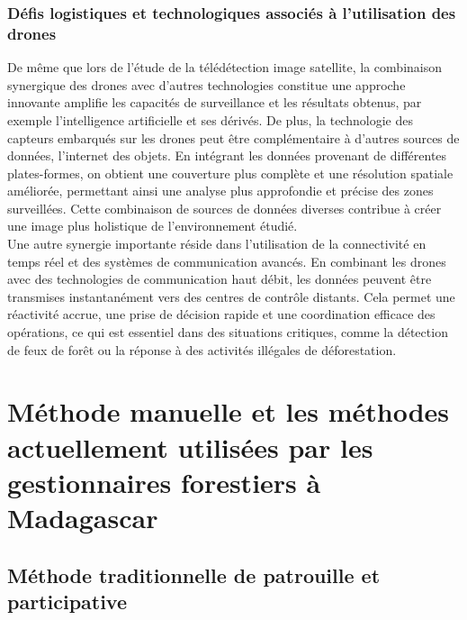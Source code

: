 \subsubsection{Défis logistiques et technologiques associés à l'utilisation des drones}
De même que lors de l’étude de la télédétection image satellite, la combinaison synergique des drones avec d'autres technologies constitue une approche innovante amplifie les capacités de surveillance et les résultats obtenus, par exemple l’intelligence artificielle et ses dérivés. De plus, la technologie des capteurs embarqués sur les drones peut être complémentaire à d'autres sources de données, l’internet des objets. En intégrant les données provenant de différentes plates-formes, on obtient une couverture plus complète et une résolution spatiale améliorée, permettant ainsi une analyse plus approfondie et précise des zones surveillées. Cette combinaison de sources de données diverses contribue à créer une image plus holistique de l'environnement étudié.
\\

Une autre synergie importante réside dans l'utilisation de la connectivité en temps réel et des systèmes de communication avancés. En combinant les drones avec des technologies de communication haut débit, les données peuvent être transmises instantanément vers des centres de contrôle distants. Cela permet une réactivité accrue, une prise de décision rapide et une coordination efficace des opérations, ce qui est essentiel dans des situations critiques, comme la détection de feux de forêt ou la réponse à des activités illégales de déforestation.

\section{Méthode manuelle et les méthodes actuellement utilisées par les gestionnaires forestiers à Madagascar}
\subsection{Méthode traditionnelle de patrouille et participative}
